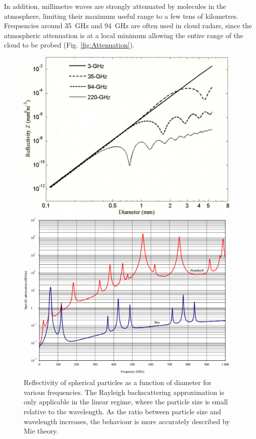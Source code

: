 \documentclass{article}
\begin{document}
In addition, millimetre waves are strongly attenuated by molecules in the atmosphere, limiting their maximum useful range to a few tens of kilometres. Frequencies around \SI{35}{\giga\hertz} and \SI{94}{\giga\hertz} are often used in cloud radars, since the atmospheric attenuation is at a local minimum allowing the entire range of the cloud to be probed (Fig. \ref{fig:Attenuation}).

\begin{figure}
	\centering
	\begin{minipage}{0.48\textwidth}
		\includegraphics[width=0.98\textwidth]{rayleigh-2}
		\caption{Reflectivity of spherical particles as a function of diameter for various frequencies.\supercite{KolliasFrontier} The Rayleigh backscattering approximation is only applicable in the linear regime, where the particle size is small relative to the wavelength. As the ratio between particle size and wavelength increases, the behaviour is more accurately described by Mie theory.\supercite{POMRRayleighScattering}}
		\label{fig:RayleighCurve}
	\end{minipage}
	\hfill
	\begin{minipage}{0.48\textwidth}
		\includegraphics[width=0.98\textwidth]{attenuation}

\end{minipage}
\end{figure}
\end{document}
